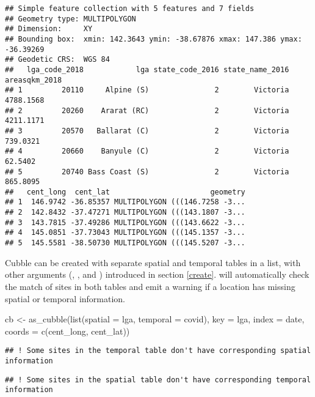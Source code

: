 \documentclass{article}
\newenvironment{Shaded}{\begin{snugshade}}{\end{snugshade}}
\newcommand{\AttributeTok}[1]{\textcolor[rgb]{0.77,0.63,0.00}{#1}}
\newcommand{\FunctionTok}[1]{\textcolor[rgb]{0.00,0.00,0.00}{#1}}
\newcommand{\NormalTok}[1]{#1}
\newcommand{\OtherTok}[1]{\textcolor[rgb]{0.56,0.35,0.01}{#1}}
\begin{document}
\begin{verbatim}
## Simple feature collection with 5 features and 7 fields
## Geometry type: MULTIPOLYGON
## Dimension:     XY
## Bounding box:  xmin: 142.3643 ymin: -38.67876 xmax: 147.386 ymax: -36.39269
## Geodetic CRS:  WGS 84
##   lga_code_2018            lga state_code_2016 state_name_2016 areasqkm_2018
## 1         20110     Alpine (S)               2        Victoria     4788.1568
## 2         20260    Ararat (RC)               2        Victoria     4211.1171
## 3         20570   Ballarat (C)               2        Victoria      739.0321
## 4         20660    Banyule (C)               2        Victoria       62.5402
## 5         20740 Bass Coast (S)               2        Victoria      865.8095
##   cent_long  cent_lat                       geometry
## 1  146.9742 -36.85357 MULTIPOLYGON (((146.7258 -3...
## 2  142.8432 -37.47271 MULTIPOLYGON (((143.1807 -3...
## 3  143.7815 -37.49286 MULTIPOLYGON (((143.6622 -3...
## 4  145.0851 -37.73043 MULTIPOLYGON (((145.1357 -3...
## 5  145.5581 -38.50730 MULTIPOLYGON (((145.5207 -3...
\end{verbatim}

Cubble can be created with separate spatial and temporal tables in a list, with other arguments (, , and ) introduced in section \ref{create}.  will automatically check the match of sites in both tables and emit a warning if a location has missing spatial or temporal information.

\begin{Shaded}
\begin{Highlighting}[]
\NormalTok{cb }\OtherTok{\textless{}{-}} \FunctionTok{as\_cubble}\NormalTok{(}\FunctionTok{list}\NormalTok{(}\AttributeTok{spatial =}\NormalTok{ lga, }\AttributeTok{temporal =}\NormalTok{ covid),}
                \AttributeTok{key =}\NormalTok{ lga, }\AttributeTok{index =}\NormalTok{ date, }\AttributeTok{coords =} \FunctionTok{c}\NormalTok{(cent\_long, cent\_lat))}
\end{Highlighting}
\end{Shaded}

\begin{verbatim}
## ! Some sites in the temporal table don't have corresponding spatial information
\end{verbatim}

\begin{verbatim}
## ! Some sites in the spatial table don't have corresponding temporal information
\end{verbatim}
\end{document}
